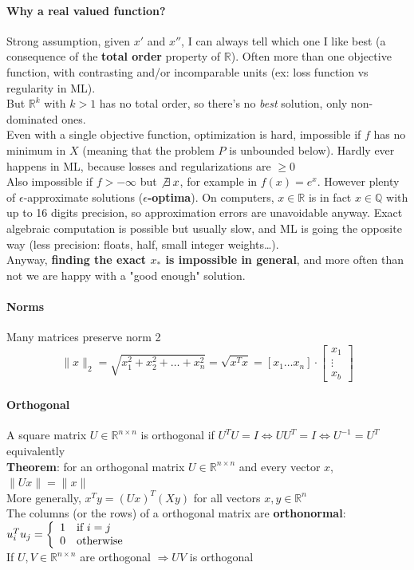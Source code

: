 \documentclass[10pt]{report}
\begin{document}
\paragraph{Why a real valued function?} Strong assumption, given $x'$ and $x''$, I can always tell which one I like best (a consequence of the \textbf{total order} property of $\mathbb{R}$). Often more than one objective function, with contrasting and/or incomparable units (ex: loss function vs regularity in ML).\\
But $\mathbb{R}^k$ with $k > 1$ has no total order, so there's no \textit{best} solution, only non-dominated ones.\\
Even with a single objective function, optimization is hard, impossible if $f$ has no minimum in $X$ (meaning that the problem $P$ is unbounded below). Hardly ever happens in ML, because losses and regularizations are $\geq 0$\\
Also impossible if $f > -\infty$ but $\not\exists\:x$, for example in $f(x) = e^x$. However plenty of $\epsilon$-approximate solutions (\textbf{$\epsilon$-optima}). On computers, $x\in \mathbb{R}$ is in fact $x\in \mathbb{Q}$ with up to 16 digits precision, so approximation errors are unavoidable anyway. Exact algebraic computation is possible but usually slow, and ML is going the opposite way (less precision: floats, half, small integer weights\ldots).\\
Anyway, \textbf{finding the exact $x_*$ is impossible in general}, and more often than not we are happy with a "good enough" solution.


\paragraph{Norms} Many matrices preserve norm 2
 $$\|x\|_2 = \sqrt{x_1^2 + x_2^2 + \ldots + x_n^2} = \sqrt{x^T x} = \left[x_1 \ldots x_n\right]\cdot\left[\begin{array}{c}
	x_1\\\vdots\\x_b
	\end{array}\right]$$
\paragraph{Orthogonal} A square matrix $U\in \mathbb{R}^{n\times n}$ is orthogonal if $U^TU = I \Leftrightarrow UU^T = I \Leftrightarrow U^{-1} = U^T$ equivalently\\
\textbf{Theorem}: for an orthogonal matrix $U\in \mathbb{R}^{n\times n}$ and every vector $x$, $\|Ux\| = \|x\|$\\
More generally, $x^T y = (Ux)^T(Xy)$ for all vectors $x,y\in \mathbb{R}^n$\\
The columns (or the rows) of a orthogonal matrix are \textbf{orthonormal}: $u_i^Tu_j = \left\{\begin{array}{l l}
1 &\text{if } i = j\\0&\text{otherwise}
\end{array}\right.$\\
If $U,V\in \mathbb{R}^{n\times n}$ are orthogonal $\Rightarrow UV$ is orthogonal
\end{document}
